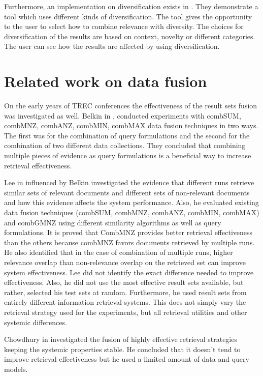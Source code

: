 Furthermore, an implementation on diversification exists in \cite{DrosouPitoura}. They demonstrate a tool which uses different kinds of diversification. The tool gives the opportunity to the user to select how to combine relevance with diversity. The choices for diversification of the results are based on context, novelty or different categories. The user can see how the results are affected by using diversification.


\section{Related work on data fusion}
On the early years of TREC conferences the effectiveness of the result sets fusion was investigated as well. Belkin in \cite{Belkin}, conducted experiments with combSUM, combMNZ, combANZ, combMIN, combMAX data fusion techniques in two ways. The first was for the combination of query formulations and the second for the combination of two different data collections. They concluded that combining multiple pieces of evidence as query formulations is a beneficial way to increase retrieval effectiveness.

Lee in \cite{Lee} influenced by Belkin investigated the evidence that different runs retrieve similar sets of relevant documents and different sets of non-relevant documents and how this evidence affects the system performance. Also, he evaluated existing data fusion techniques (combSUM, combMNZ, combANZ, combMIN, combMAX) and combGMNZ using different similarity algorithms as well as query formulations. It is proved that CombMNZ provides better retrieval effectiveness than the others because combMNZ favors documents retrieved by multiple runs. He also identified that in the case of combination of multiple runs, higher relevance overlap than non-relevance overlap on the retrieved set can improve system effectiveness. Lee did not identify the exact difference needed to improve effectiveness. Also, he did not use the most effective result sets available, but rather, selected his test sets at random. Furthermore, he used result sets from entirely different information retrieval systems. This does not simply vary the retrieval strategy used for the experiments, but all retrieval utilities and other systemic differences.

Chowdhury in \cite{Chowdhury} investigated the fusion of highly effective retrieval strategies keeping the systemic properties stable. He concluded that it doesn't tend to improve retrieval effectiveness but he used a limited amount of data and query models.

